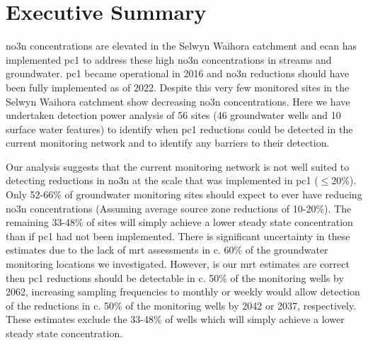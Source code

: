 
\section*{Executive Summary} \label{exsum} %

\gls{no3n} concentrations are elevated in the Selwyn Waihora catchment and \gls{ecan} has implemented \gls{pc1} to address these high \gls{no3n} concentrations in streams and groundwater. \gls{pc1} became operational in 2016 and \gls{no3n} reductions should have been fully implemented as of 2022. Despite this very few monitored sites in the Selwyn Waihora catchment show decreasing \gls{no3n} concentrations. Here we have undertaken detection power analysis of 56 sites (46 groundwater wells and 10 surface water features) to identify when \gls{pc1} reductions could be detected in the current monitoring network and to identify any barriers to their detection.

Our analysis suggests that the current monitoring network is not well suited to detecting reductions in \gls{no3n} at the scale that was implemented in \gls{pc1} ($\leq$20\%). Only 52-66\% of groundwater monitoring sites should expect to ever have reducing \gls{no3n} concentrations (Assuming average source zone reductions of 10-20\%). The remaining 33-48\% of sites will simply achieve a lower steady state concentration than if \gls{pc1} had not been implemented. There is significant uncertainty in these estimates due to the lack of \gls{mrt} assessments in c. 60\% of the groundwater monitoring locations we investigated. However, is our \gls{mrt} estimates are correct then \gls{pc1} reductions should be detectable in c. 50\% of the monitoring wells by 2062, increasing sampling frequencies to monthly or weekly would allow detection of the reductions in c. 50\% of the monitoring wells by 2042 or 2037, respectively. These estimates exclude the 33-48\% of wells which will simply achieve a lower steady state concentration.

